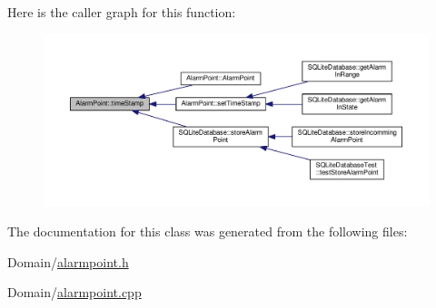 Here is the caller graph for this function\+:
\nopagebreak
\begin{figure}[H]
\begin{center}
\leavevmode
\includegraphics[width=350pt]{class_alarm_point_a9a05c45965eb312ac66737f43e18e6fe_icgraph}
\end{center}
\end{figure}




The documentation for this class was generated from the following files\+:\begin{DoxyCompactItemize}
\item 
Domain/\hyperlink{alarmpoint_8h}{alarmpoint.\+h}\item 
Domain/\hyperlink{alarmpoint_8cpp}{alarmpoint.\+cpp}\end{DoxyCompactItemize}
